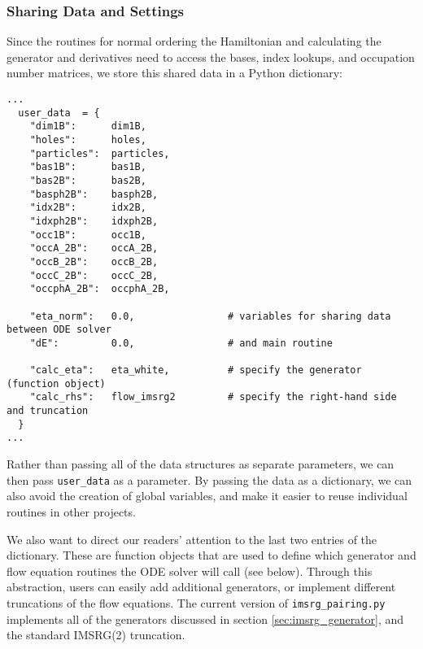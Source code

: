 \subsubsection*{Sharing Data and Settings}
Since the routines for normal ordering the Hamiltonian and calculating 
the generator and derivatives need to access the bases, index lookups,
and occupation number matrices, we store this shared data in a Python
dictionary:

\begin{lstlisting}
...
  user_data  = {
    "dim1B":      dim1B, 
    "holes":      holes,
    "particles":  particles,
    "bas1B":      bas1B,
    "bas2B":      bas2B,
    "basph2B":    basph2B,
    "idx2B":      idx2B,
    "idxph2B":    idxph2B,
    "occ1B":      occ1B,
    "occA_2B":    occA_2B,
    "occB_2B":    occB_2B,
    "occC_2B":    occC_2B,
    "occphA_2B":  occphA_2B,

    "eta_norm":   0.0,                # variables for sharing data between ODE solver
    "dE":         0.0,                # and main routine
    
    "calc_eta":   eta_white,          # specify the generator (function object)
    "calc_rhs":   flow_imsrg2         # specify the right-hand side and truncation
  }
...
\end{lstlisting}

Rather than passing all of the data structures as separate parameters, we
can then pass \texttt{user\_data} as a parameter. By passing the data as a
dictionary, we can also avoid the creation of global variables, and make
it easier to reuse individual routines in other projects.

We also want to direct our readers' attention to the last two entries of
the dictionary. These are function objects that are used to define which
generator and flow equation routines the ODE solver will call (see below).
Through this abstraction, users can easily add additional generators, or
implement different truncations of the flow equations. The current version
of \texttt{imsrg\_pairing.py} implements all of the generators discussed
in section \ref{sec:imsrg_generator}, and the standard IMSRG(2) truncation.

